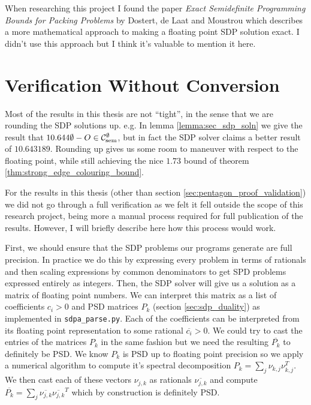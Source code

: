 \begin{note*}
    When researching this project I found the paper
    \textit{Exact Semidefinite Programming Bounds for Packing Problems} by
    Dostert, de Laat and Moustrou \cite{dostertExactSemidefiniteProgramming2021}
    which describes a more mathematical approach to making a floating point SDP solution
    exact. I didn't use this approach but I think it's valuable to mention it here.
\end{note*}

\section*{Verification Without Conversion}

Most of the results in this thesis are not ``tight'', in the sense that we are rounding
the SDP solutions up. e.g. In lemma \ref{lemma:sec_sdp_soln} we give the result that
$10.644\emptyset - O \in\mathcal{C}_\mathrm{sem}^\emptyset$, but in fact the SDP solver claims a
better result of $10.643189$. Rounding up gives us some room to maneuver with respect
to the floating point, while still achieving the nice $1.73$ bound of theorem
\ref{thm:strong_edge_colouring_bound}.

For the results in this thesis (other than section \ref{sec:pentagon_proof_validation})
we did not go through a full verification as we felt it
fell outside the scope of this research project, being more a manual process required for
full publication of the results. However, I will briefly describe here how this process
would work.

First, we should ensure that the SDP problems our programs generate are full precision.
In practice we do this by expressing every problem in terms of rationals and then scaling
expressions by common denominators to get SPD problems expressed entirely as integers.
Then, the SDP solver will give us a solution as a matrix of floating point numbers. We
can interpret this matrix as a list of coefficients $c_i > 0$ and PSD matrices $P_k$
(section \ref{sec:sdp_duality}) as implemented in \verb|sdpa_parse.py|. Each of the 
coefficients can be interpreted from its floating point representation to some
rational $\overline{c_i} > 0$. We could try to cast the entries of the matrices $P_k$
in the same fashion but we need the resulting $\overline{P_k}$ to definitely be PSD.
We know $P_k$ is PSD up to floating point precision so we apply a numerical algorithm
to compute it's spectral decomposition $P_k=\sum_j\nu_{k,j}\nu_{k,j}^T$. We then cast
each of these vectors $\nu_{j,k}$ as rationals $\overline{\nu_{j,k}}$ and compute
$\overline{P_k}=\sum_j\overline{\nu_{j,k}}\overline{\nu_{j,k}}^T$ which by construction
is definitely PSD.

